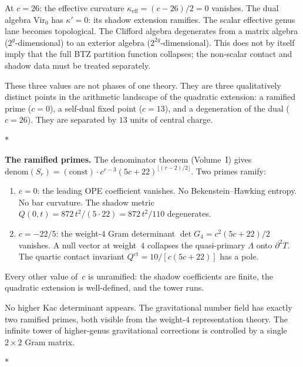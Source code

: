 \documentclass[11pt]{article}
\newcommand{\sep}{\bigskip\begin{center}$*$\end{center}\medskip}
\begin{document}
At $c = 26$: the effective curvature $\kappa_{\mathrm{eff}}
= (c{-}26)/2 = 0$ vanishes.  The dual algebra
$\mathrm{Vir}_0$ has $\kappa' = 0$: its shadow extension
ramifies.  The scalar effective genus lane becomes topological.
The Clifford algebra degenerates from a matrix algebra
($2^g$-dimensional) to an exterior algebra
($2^{2g}$-dimensional).  This does not by itself imply that the
full BTZ partition function collapses; the non-scalar contact and
shadow data must be treated separately.

These three values are not phases of one theory.  They are three
qualitatively distinct points in the arithmetic landscape of the
quadratic extension: a ramified prime ($c = 0$), a self-dual
fixed point ($c = 13$), and a degeneration of the dual
($c = 26$).  They are separated by $13$ units of central charge.

\sep

\noindent\textbf{The ramified primes.}\enspace
The denominator theorem (Volume~I) gives
$\mathrm{denom}(S_r)
= (\mathrm{const})\cdot c^{r-3}(5c{+}22)^{\lfloor(r-2)/2\rfloor}$.
Two primes ramify:
\begin{enumerate}[label=(\roman*),nosep]
\item $c = 0$: the leading OPE coefficient vanishes.  No
  Bekenstein--Hawking entropy.  No bar curvature.  The shadow
  metric $Q(0,t) = 872\,t^2/(5 \cdot 22) = 872\,t^2/110$
  degenerates.
\item $c = -22/5$: the weight-$4$ Gram determinant
  $\det G_4 = c^2(5c{+}22)/2$ vanishes.  A null vector at
  weight~$4$ collapses the quasi-primary $\Lambda$ onto
  $\partial^2 T$.  The quartic contact invariant
  $Q^{\mathrm{ct}} = 10/[c(5c{+}22)]$ has a pole.
\end{enumerate}
Every other value of~$c$ is unramified: the shadow
coefficients are finite, the quadratic extension is
well-defined, and the tower runs.

No higher Kac determinant appears.  The gravitational number
field has exactly two ramified primes, both visible from the
weight-$4$ representation theory.  The infinite tower of
higher-genus gravitational corrections is controlled by a
single $2 \times 2$ Gram matrix.

\sep
\end{document}
